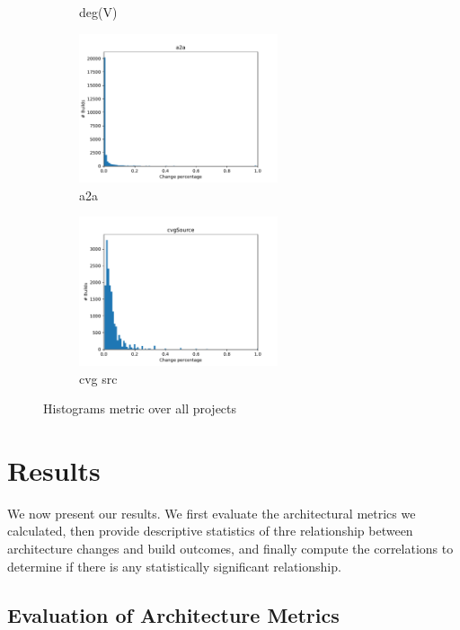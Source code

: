 \documentclass[sigplan, anonymous, review]{acmart}
\begin{document}
\begin{figure}[!t]
\begin{subfigure}{2.3in}
		\caption{deg(V)}
		\label{nodDegHist}
	\end{subfigure}%
	\begin{subfigure}{2.3in}
		\centering
		\includegraphics[width=2.3in]{assets/a2a.pdf}
		\caption{a2a}
		\label{a2aHist}
	\end{subfigure}%
	\begin{subfigure}{2.3in}
		\centering
		\includegraphics[width=2.3in]{assets/cvgSource.pdf}
		\caption{cvg src}
		\label{cvgHist}
	\end{subfigure}
	\caption{Histograms metric over all projects}
	\label{fig:histograms}
	
\end{figure}

\section{Results}

We now present our results. We first evaluate the architectural metrics we calculated, then provide descriptive statistics of thre relationship between architecture changes and build outcomes, and finally compute the correlations to determine if there is any statistically significant relationship.

\subsection{Evaluation of Architecture Metrics}


\end{document}
